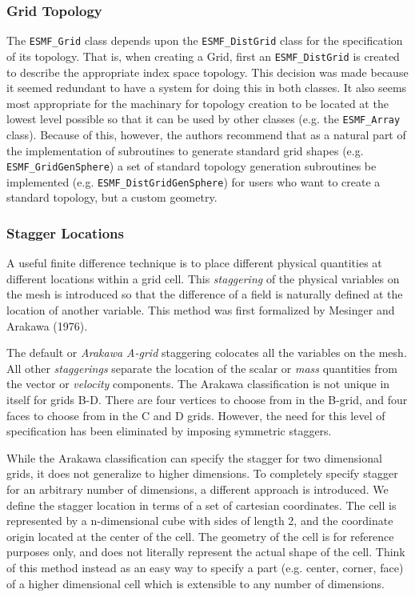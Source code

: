 


\subsubsection{Grid Topology} 

The {\tt ESMF\_Grid} class depends upon the {\tt ESMF\_DistGrid} class
for the specification of its topology. That is, when 
creating a Grid, first an {\tt ESMF\_DistGrid} is created to describe the 
appropriate index space topology. This decision was
made because it seemed redundant to have a system for doing this
in both classes. It also seems most appropriate for
the machinary for topology creation to be located at the lowest
level possible so that it can be used by other
classes (e.g. the {\tt ESMF\_Array} class). Because of this, however,
the authors recommend that as a natural part of the 
implementation of subroutines to generate standard grid shapes
(e.g. {\tt ESMF\_GridGenSphere}) a set of standard
topology generation subroutines be implemented (e.g. {\tt ESMF\_DistGridGenSphere}) for users who want to create a standard topology, but a custom geometry.


\subsubsection{Stagger Locations}\label{ref:stagger}
A useful finite difference technique is to place different physical quantities at different locations within a grid cell. This {\em {staggering}} of the physical variables on the mesh is introduced so that the difference of a field is naturally defined at the location of another variable. This method was first formalized by Mesinger and Arakawa (1976).

The default or {\em{Arakawa A-grid}} staggering colocates all the variables on the mesh. All other {\em{staggerings}} separate the location of the scalar or {\em{mass}} quantities from the vector or {\em{velocity}} components. The Arakawa classification is not unique in itself for grids B-D. There are four vertices to choose from in the B-grid, and four faces to choose from in the C and D grids. However, the need for this level of specification has been eliminated by imposing symmetric staggers.

While the Arakawa classification can specify the stagger for two dimensional grids, it does not generalize to higher dimensions. To completely specify stagger for an arbitrary number of dimensions, a different approach is introduced. We define the stagger location in terms of a set of cartesian coordinates. The cell is represented by a n-dimensional cube with sides of length 2, and the coordinate origin located at the center of the cell. The geometry of the cell is for reference purposes only, and does not literally represent the actual shape of the cell. Think of this method instead as an easy way to specify a part (e.g. center, corner, face) of a higher dimensional cell which is extensible to any number of dimensions. 

